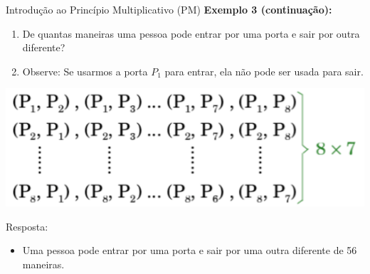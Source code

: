 \documentclass[aspectratio=169]{beamer}
\begin{document}
\begin{frame}{Introdução ao Princípio Multiplicativo (PM)}
    \textbf{Exemplo 3 (continuação):}

    \vspace{2mm}

        \begin{enumerate}[b]
            \item De quantas maneiras uma pessoa pode entrar por uma
            porta e sair por outra diferente?
            \item[] Observe: Se usarmos a porta $P_1$ para entrar, ela não pode
            ser usada para sair.
        \end{enumerate}

    \vspace{2mm}
   

    \begin{center}
        \includegraphics[width=0.5\linewidth]{figs/combinacoes_portas2.png}
    \end{center}

    Resposta:

    \vspace{3mm}
    \begin{itemize}
        \item Uma pessoa pode entrar por uma porta e sair por uma
        outra diferente de 56 maneiras.
    \end{itemize}

\end{frame}
\end{document}
